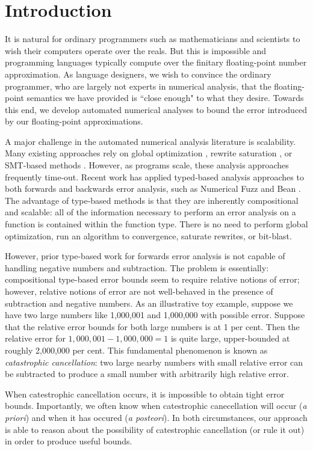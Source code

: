 \section{Introduction}
It is natural for ordinary programmers such as mathematicians and scientists to
wish their computers operate over the reals. 
But this is impossible and programming languages typically compute over the
finitary floating-point number approximation.
As language designers, we wish to convince the ordinary programmer, who are
largely not experts in numerical analysis, that the floating-point semantics we
have provided is ``close enough" to what they desire.
Towards this end, we develop automated numerical analyses to bound the error
introduced by our floating-point approximations.

A major challenge in the automated numerical analysis literature is scalability.
Many existing approaches rely on global optimization \cite{fptaylor}
\cite{satire}, rewrite saturation \cite{gappa}, or SMT-based methods
\cite{rosa}. However, as programs scale, these analysis approaches frequently
time-out. Recent work has applied typed-based analysis approaches to both
forwards and backwards error analysis, such as Numerical Fuzz \cite{numfuzz} and
Bean \cite{bean}. The advantage of type-based methods is that they are
inherently compositional and scalable: all of the information necessary to
perform an error analysis on a function is contained within the function type.
There is no need to perform global optimization, run an algorithm to
convergence, saturate rewrites, or bit-blast.

However, prior type-based work for forwards error analysis is not capable of
handling negative numbers and subtraction. The problem is essentially:
compositional type-based error bounds seem to require relative notions of error;
however, relative notions of error are not well-behaved in the presence of
subtraction and negative numbers. As an illustrative toy example, suppose we
have two large numbers like 1,000,001 and 1,000,000 with possible error. Suppose
that the relative error bounds for both large numbers is at 1 per cent. Then the
relative error for $1,000,001 - 1,000,000 = 1$ is quite large, upper-bounded at
roughly 2,000,000 per cent.
This fundamental phenomenon is known as \textit{catastrophic cancellation}: two
large nearby numbers with small relative error can be subtracted to produce a
small number with arbitrarily high relative error. 

When catestrophic cancellation occurs, it is impossible to obtain tight error
bounds. Importantly, we often know when catestrophic canecellation will occur
(\textit{a priori}) and when it has occured (\textit{a posteori}). In both
circumstances, our approach is able to reason about the possibility of
catestrophic cancellation (or rule it out) in order to produce useful bounds.

